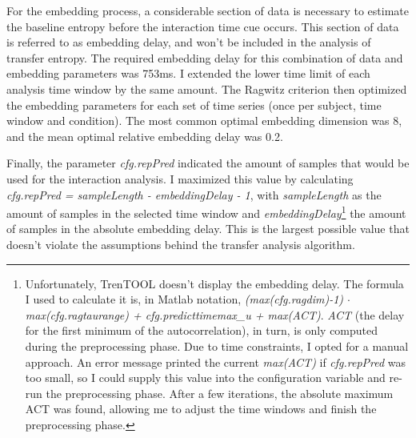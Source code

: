 For the embedding process, a considerable section of data is necessary to estimate the baseline entropy before the interaction time cue occurs.
This section of data is referred to as embedding delay, and won't be included in the analysis of transfer entropy.
The required embedding delay for this combination of data and embedding parameters was 753ms.
I extended the lower time limit of each analysis time window by the same amount.
The Ragwitz criterion then optimized the embedding parameters for each set of time series (once per subject, time window and condition).
The most common optimal embedding dimension was 8, and the mean optimal relative embedding delay was 0.2.

Finally, the parameter \emph{cfg.repPred} indicated the amount of samples that would be used for the interaction analysis.
I maximized this value by calculating \emph{cfg.repPred = sampleLength - embeddingDelay - 1}, with \emph{sampleLength} as the amount of samples in the selected time window and \emph{embeddingDelay}\footnote{Unfortunately, TrenTOOL doesn't display the embedding delay. The formula I used to calculate it is, in Matlab notation, \emph{(max(cfg.ragdim)-1) $\cdot$ max(cfg.ragtaurange) + cfg.predicttimemax\_u + max(ACT)}. \emph{ACT} (the delay for the first minimum of the autocorrelation), in turn, is only computed during the preprocessing phase. Due to time constraints, I opted for a manual approach. An error message printed the current \emph{max(ACT)} if \emph{cfg.repPred} was too small, so I could supply this value into the configuration variable and re-run the preprocessing phase. After a few iterations, the absolute maximum ACT was found, allowing me to adjust the time windows and finish the preprocessing phase.} the amount of samples in the absolute embedding delay.
This is the largest possible value that doesn't violate the assumptions behind the transfer analysis algorithm.


